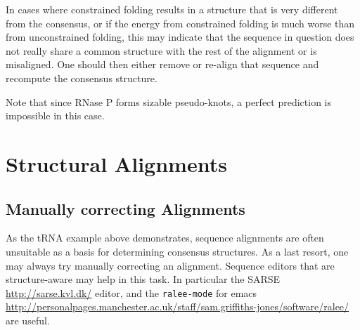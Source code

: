 \documentclass[a4paper]{article}
\newcommand{\frametitle}[1]{\subsubsection{#1}}
\newcommand{\TODO}[1]{{\textcolor{red}{* #1 *}}}
\begin{document}
In cases where constrained folding results in a structure that is very
different from the consensus, or if the energy from constrained
folding is much worse than from unconstrained folding, this may
indicate that the sequence in question does not really share a common
structure with the rest of the alignment or is misaligned. One should
then either remove or re-align that sequence and recompute the
consensus structure.

Note that since RNase P forms sizable pseudo-knots, a perfect
prediction is impossible in this case.


%
%
%
%





\section{Structural Alignments}

\subsection{Manually correcting Alignments}
As the tRNA example above demonstrates, sequence alignments are often
unsuitable as a basis for determining consensus structures. As a last
resort, one may always try manually correcting an alignment. Sequence
editors that are structure-aware may help in this task.
In particular the SARSE \url{http://sarse.kvl.dk/} editor, and the
\texttt{ralee-mode} for emacs
\url{http://personalpages.manchester.ac.uk/staff/sam.griffiths-jones/software/ralee/} 
are useful.
\end{document}
